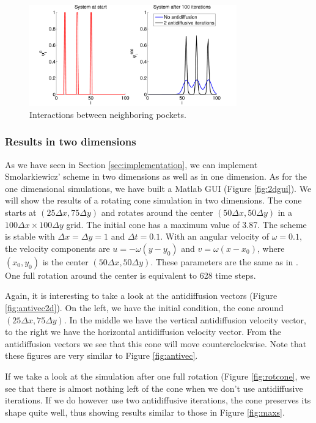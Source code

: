 \documentclass[10pt, a4paper]{article}
\begin{document}
\begin{figure}
\centering
 \includegraphics[width=0.8\textwidth]{../presentation/animation/peaks-eps-converted-to.pdf}
 \caption{Interactions between neighboring pockets.}
 \label{fig:1ocal}
\end{figure}

\subsubsection{Results in two dimensions}

As we have seen in Section \ref{sec:implementation}, we can implement Smolarkiewicz' scheme in two dimensions as well as in one dimension. As for the one dimensional simulations, we have built a Matlab GUI (Figure \ref{fig:2dgui}). We will show the results of a rotating cone simulation in two dimensions. The cone starts at $(25\Delta x, 75\Delta y)$ and rotates around the center $(50 \Delta x, 50 \Delta y)$ in a $100 \Delta x \times 100 \Delta y$ grid. The initial cone has a maximum value of 3.87. The scheme is stable with $\Delta x = \Delta y = 1$ and $\Delta t = 0.1$. With an angular velocity of $\omega = 0.1$, the velocity components are $u=-\omega(y-y_0)$ and $v=\omega(x-x_0)$, where $(x_0,y_0)$ is the center $(50 \Delta x, 50 \Delta y)$. These parameters are the same as in \cite{smolarki}. One full rotation around the center is equivalent to 628 time steps.

Again, it is interesting to take a look at the antidiffusion vectors (Figure \ref{fig:antivec2d}). On the left, we have the initial condition, the cone around $(25\Delta x, 75\Delta y)$. In the middle we have the vertical antidiffusion velocity vector, to the right we have the horizontal antidiffusion velocity vector. From the antidiffusion vectors we see that this cone will move counterclockwise. Note that these figures are very similar to Figure \ref{fig:antivec}.

If we take a look at the simulation after one full rotation (Figure \ref{fig:rotcone}, we see that there is almost nothing left of the cone when we don't use antidiffusive iterations. If we do however use two antidiffusive iterations, the cone preserves its shape quite well, thus showing results similar to those in Figure \ref{fig:maxs}.
\end{document}
